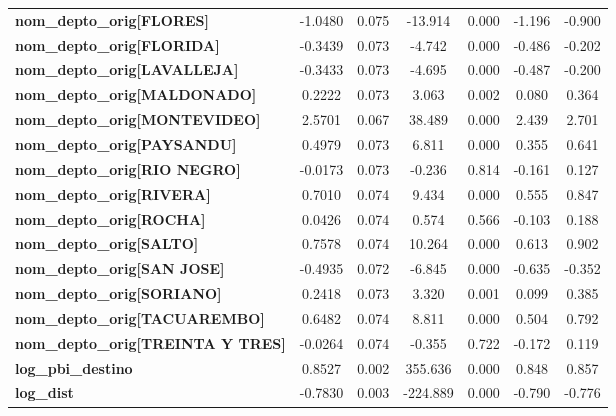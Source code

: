 \begin{center}
\begin{tabular}{lcccccc}
\textbf{nom\_depto\_orig[FLORES]}         &      -1.0480  &        0.075     &   -13.914  &         0.000        &       -1.196    &       -0.900     \\
\textbf{nom\_depto\_orig[FLORIDA]}        &      -0.3439  &        0.073     &    -4.742  &         0.000        &       -0.486    &       -0.202     \\
\textbf{nom\_depto\_orig[LAVALLEJA]}      &      -0.3433  &        0.073     &    -4.695  &         0.000        &       -0.487    &       -0.200     \\
\textbf{nom\_depto\_orig[MALDONADO]}      &       0.2222  &        0.073     &     3.063  &         0.002        &        0.080    &        0.364     \\
\textbf{nom\_depto\_orig[MONTEVIDEO]}     &       2.5701  &        0.067     &    38.489  &         0.000        &        2.439    &        2.701     \\
\textbf{nom\_depto\_orig[PAYSANDU]}       &       0.4979  &        0.073     &     6.811  &         0.000        &        0.355    &        0.641     \\
\textbf{nom\_depto\_orig[RIO NEGRO]}      &      -0.0173  &        0.073     &    -0.236  &         0.814        &       -0.161    &        0.127     \\
\textbf{nom\_depto\_orig[RIVERA]}         &       0.7010  &        0.074     &     9.434  &         0.000        &        0.555    &        0.847     \\
\textbf{nom\_depto\_orig[ROCHA]}          &       0.0426  &        0.074     &     0.574  &         0.566        &       -0.103    &        0.188     \\
\textbf{nom\_depto\_orig[SALTO]}          &       0.7578  &        0.074     &    10.264  &         0.000        &        0.613    &        0.902     \\
\textbf{nom\_depto\_orig[SAN JOSE]}       &      -0.4935  &        0.072     &    -6.845  &         0.000        &       -0.635    &       -0.352     \\
\textbf{nom\_depto\_orig[SORIANO]}        &       0.2418  &        0.073     &     3.320  &         0.001        &        0.099    &        0.385     \\
\textbf{nom\_depto\_orig[TACUAREMBO]}     &       0.6482  &        0.074     &     8.811  &         0.000        &        0.504    &        0.792     \\
\textbf{nom\_depto\_orig[TREINTA Y TRES]} &      -0.0264  &        0.074     &    -0.355  &         0.722        &       -0.172    &        0.119     \\
\textbf{log\_pbi\_destino}                &       0.8527  &        0.002     &   355.636  &         0.000        &        0.848    &        0.857     \\
\textbf{log\_dist}                        &      -0.7830  &        0.003     &  -224.889  &         0.000        &       -0.790    &       -0.776     \\
\bottomrule
\end{tabular}
\end{center}